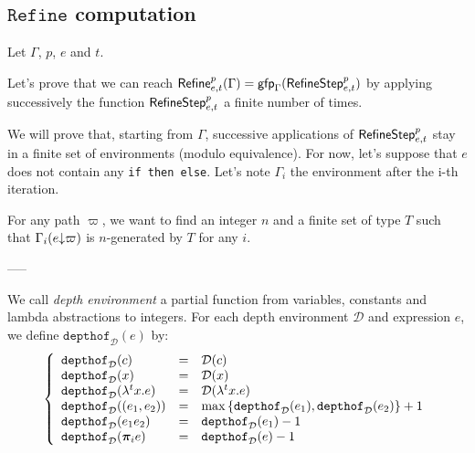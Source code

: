 \documentclass[a4paper]{article}
\theoremstyle{definition}
\begin{document}
  \subsection{$\texttt{Refine}$ computation}

  Let $\Gamma$, $p$, $e$ and $t$.

    Let's prove that we can reach $\textsf{Refine}^{p}_{e,t}(\Gamma)=\textsf{gfp}_\Gamma (\textsf{RefineStep}^{p}_{e,t})$ by applying successively the function $\textsf{RefineStep}^{p}_{e,t}$ a finite number of times.

    We will prove that, starting from $\Gamma$, successive applications of $\textsf{RefineStep}^{p}_{e,t}$ stay in a finite set of environments (modulo equivalence).
    For now, let's suppose that $e$ does not contain any \texttt{if then else}. Let's note $\Gamma_i$ the environment after the i-th iteration.

    For any path $\varpi$, we want to find an integer $n$ and a finite set of type $T$ such that $\Gamma_i(e{\downarrow}\varpi)$
    is $n$-generated by $T$ for any $i$.

    -----

    \newcommand{\depth}[0]{\mathcal{D}}
    \newcommand{\pathdep}[2]{\texttt{path\_depth}_{#1}(#2)}
    \newcommand{\depof}[2]{\texttt{depthof}_{#1}(#2)}
    \newcommand{\rds}[1]{\texttt{RefineDepthStep}_{#1}}
    \newcommand{\rd}[2]{\texttt{RefineDepth}_{#1}(#2)}

    We call \textit{depth environment} a partial function from variables, constants and lambda abstractions
    to integers. For each depth environment $\depth$ and expression $e$, we define $\depof \depth e$ by:
    \[
      \left\{
        \begin{array}{lcl}
          \depof{\depth}{c} & = & \depth(c) \\
          \depof{\depth}{x} & = & \depth(x) \\
          \depof{\depth}{\lambda^tx.e} & = & \depth(\lambda^tx.e) \\
          \depof{\depth}{(e_1,e_2)} & = & \max {\{\depof{\depth}{e_1},\depof{\depth}{e_2}\}}+1 \\
          \depof{\depth}{e_1 e_2} & = & \depof{\depth}{e_1}-1 \\
          \depof{\depth}{\bpi_i e} & = & \depof{\depth}{e}-1
        \end{array}  
      \right.
    \]
\end{document}
